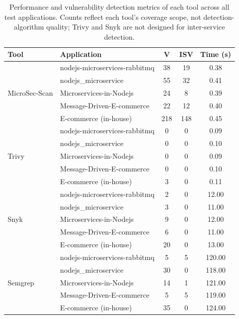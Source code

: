 \documentclass[preprint,12pt]{elsarticle}
\newcommand{\new}[1]{#1}
\newcommand{\safefixtablestyle}{%
  \small
  \setlength{\tabcolsep}{5pt}
  \renewcommand{\arraystretch}{1.15}
}
\begin{document}
\begin{table}[!t]
\centering
\caption{Performance and vulnerability detection metrics of each tool across all test applications. \new{Counts reflect each tool's coverage scope, not detection-algorithm quality; Trivy and Snyk are not designed for inter-service detection.}}
\label{tab:results_by_tool}
\safefixtablestyle
\begin{tabular}{@{} l p{4.5cm} c c c @{}}
\toprule
\textbf{Tool} & \textbf{Application} & \textbf{V} & \textbf{ISV} & \textbf{Time (s)} \\
\midrule
\multirow{5}{*}{MicroSec-Scan} 
 & nodejs-microservices-rabbitmq & 38 & 19 & 0.38 \\
 & nodejs\_microservice & 55 & 32 & 0.41 \\
 & Microservices-in-Nodejs & 24 & 8 & 0.39 \\
 & Message-Driven-E-commerce & 22 & 12 & 0.40 \\
 & E-commerce (in-house) & 218 & 148 & 0.45 \\
\midrule
\multirow{5}{*}{Trivy} 
 & nodejs-microservices-rabbitmq & 0 & 0 & 0.09 \\
 & nodejs\_microservice & 0 & 0 & 0.10 \\
 & Microservices-in-Nodejs & 0 & 0 & 0.09 \\
 & Message-Driven-E-commerce & 0 & 0 & 0.10 \\
 & E-commerce (in-house) & 3 & 0 & 0.11 \\
\midrule
\multirow{5}{*}{Snyk} 
 & nodejs-microservices-rabbitmq & 2 & 0 & 12.00 \\
 & nodejs\_microservice & 3 & 0 & 11.00 \\
 & Microservices-in-Nodejs & 9 & 0 & 12.00 \\
 & Message-Driven-E-commerce & 6 & 0 & 11.00 \\
 & E-commerce (in-house) & 20 & 0 & 13.00 \\
\midrule
\multirow{5}{*}{Semgrep} 
 & nodejs-microservices-rabbitmq & 5 & 5 & 120.00 \\
 & nodejs\_microservice & 30 & 0 & 118.00 \\
 & Microservices-in-Nodejs & 14 & 1 & 121.00 \\
 & Message-Driven-E-commerce & 5 & 5 & 119.00 \\
 & E-commerce (in-house) & 35 & 0 & 124.00 \\
\bottomrule
\end{tabular}
\end{table}
\end{document}
